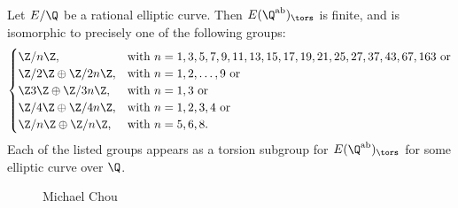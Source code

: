 \begin{frame}[plain]
\scriptsize
\begin{thm}[Chou, 2019]
Let $E/\Q$ be a rational elliptic curve. Then $E(\Q^{\text{ab}})_\tors$ is finite, and is isomorphic to precisely one of the following groups:
	\[
	\begin{cases}
	\Z/n\Z, & \text{with } n= 1, 3, 5, 7, 9, 11, 13, 15, 17, 19, 21, 25, 27, 37, 43, 67, 163 \text{ or} \\
	\Z/2\Z \oplus \Z/2n\Z, & \text{with } n= 1, 2, \ldots, 9 \text{ or} \\
	\Z3\Z \oplus \Z/3n\Z, & \text{with } n= 1, 3 \text{ or} \\
	\Z/4\Z \oplus \Z/4n\Z, & \text{with } n= 1, 2, 3, 4 \text{ or} \\
	\Z/n\Z \oplus \Z/n\Z, & \text{with } n= 5, 6, 8.
	\end{cases}
	\]
Each of the listed groups appears as a torsion subgroup for $E(\Q^{\text{ab}})_\tors$ for some elliptic curve over $\Q$. 
\end{thm}
	\begin{figure}[!ht]
	\centering
	\captionsetup{labelformat=empty}
	\caption{Michael Chou}
	\end{figure}
\end{frame}





